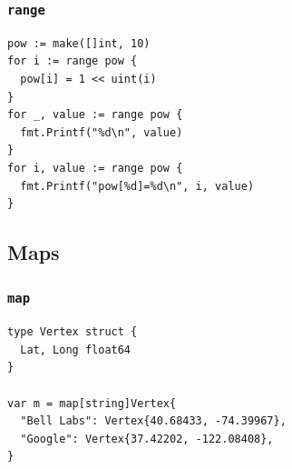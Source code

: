 \documentclass[xetex,mathserif,serif,12pt]{beamer}
\begin{document}

\begin{frame}[fragile]
  \frametitle{\texttt{range}}

  \begin{beamer@nomargin}
    \begin{lstlisting}
pow := make([]int, 10)
for i := range pow {
  pow[i] = 1 << uint(i)
}
for _, value := range pow {
  fmt.Printf("%d\n", value)
}
for i, value := range pow {
  fmt.Printf("pow[%d]=%d\n", i, value)
}
    \end{lstlisting}
  \end{beamer@nomargin}
\end{frame}

\subsection{Maps}

\begin{frame}[fragile]
  \frametitle{\texttt{map}}

  \begin{beamer@nomargin}
    \begin{lstlisting}
type Vertex struct {
  Lat, Long float64
}

var m = map[string]Vertex{
  "Bell Labs": Vertex{40.68433, -74.39967},
  "Google": Vertex{37.42202, -122.08408},
}
    \end{lstlisting}
  \end{beamer@nomargin}
\end{frame}
\end{document}
